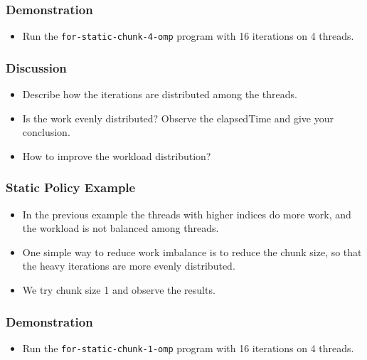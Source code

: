 \documentclass{beamer}
\begin{document}

\begin{frame}
  \frametitle{Demonstration}
  \begin{itemize}
  \item Run the {\tt for-static-chunk-4-omp} program with 16 iterations
    on 4 threads.
  \end{itemize}
\end{frame}

\begin{frame}
  \frametitle{Discussion}
  \begin{itemize}
  \item Describe how the iterations are distributed among the threads.
  \item Is the work evenly distributed? Observe the elapsedTime and give
    your conclusion.
  \item How to improve the workload distribution?
  \end{itemize}
\end{frame}




\begin{frame}
  \frametitle{Static Policy Example}
  \begin{itemize}
  \item In the previous example the threads with higher indices do
    more work, and the workload is not balanced among threads.
  \item One simple way to reduce work imbalance is to reduce the chunk
    size, so that the heavy iterations are more evenly distributed.
  \item We try chunk size 1 and observe the results.
  \end{itemize}
\end{frame}

\begin{frame}
\end{frame}

\begin{frame}
  \frametitle{Demonstration}
  \begin{itemize}
  \item Run the {\tt for-static-chunk-1-omp} program with 16 iterations
    on 4 threads.
  \end{itemize}
\end{frame}
\end{document}
